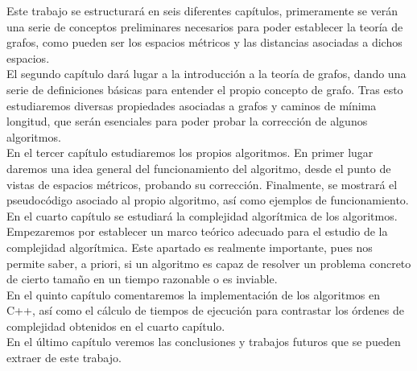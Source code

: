 Este trabajo se estructurará en seis diferentes capítulos, primeramente se verán una serie de conceptos preliminares necesarios para poder establecer la teoría de grafos, como pueden ser los espacios métricos y las distancias asociadas a dichos espacios. \\

El segundo capítulo dará lugar a la introducción a la teoría de grafos, dando una serie de definiciones básicas para entender el propio concepto de grafo. Tras esto estudiaremos diversas propiedades asociadas a grafos y caminos de mínima longitud, que serán esenciales para poder probar la corrección de algunos algoritmos. \\

En el tercer capítulo estudiaremos los propios algoritmos. En primer lugar daremos una idea general del funcionamiento del algoritmo, desde el punto de vistas de espacios métricos, probando su corrección. Finalmente, se mostrará el pseudocódigo asociado al propio algoritmo, así como ejemplos de funcionamiento. \\

En el cuarto capítulo se estudiará la complejidad algorítmica de los algoritmos. Empezaremos por establecer un marco teórico adecuado para el estudio de la complejidad algorítmica. Este apartado es realmente importante, pues nos permite saber, a priori, si un algoritmo es capaz de resolver un problema concreto de cierto tamaño en un tiempo razonable o es inviable. \\

En el quinto capítulo comentaremos la implementación de los algoritmos en C++, así como el cálculo de tiempos de ejecución para contrastar los órdenes de complejidad obtenidos en el cuarto capítulo. \\

En el último capítulo veremos las conclusiones y trabajos futuros que se pueden extraer de este trabajo.


\endinput

